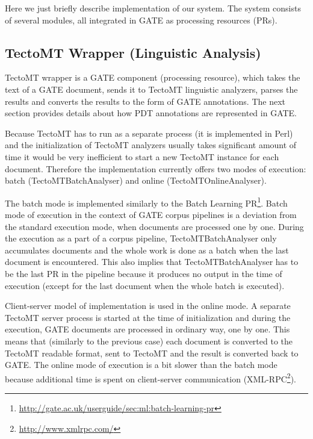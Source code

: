 Here we just briefly describe implementation of our system. The system consists of several modules, all integrated in GATE as processing resources (PRs).

\subsection{TectoMT Wrapper (Linguistic Analysis)} \label{sec:ch60_tectomt_wrapper}

TectoMT wrapper is a GATE component (processing resource), which takes the text of a GATE document, sends it to TectoMT linguistic analyzers, parses the results and converts the results to the form of GATE annotations. The next section provides details about how PDT annotations are represented in GATE.

Because TectoMT has to run as a separate process (it is implemented in Perl) and the initialization of TectoMT analyzers usually takes significant amount of time it would be very inefficient to start a new TectoMT instance for each document. Therefore the implementation currently offers two modes of execution: batch (TectoMTBatchAnalyser) and online (TectoMTOnlineAnalyser).

The batch mode is implemented similarly to the Batch Learning PR\footnote{\url{http://gate.ac.uk/userguide/sec:ml:batch-learning-pr}}. Batch mode of execution in the context of GATE corpus pipelines is a deviation from the standard execution mode, when documents are processed one by one. During the execution as a part of a corpus pipeline, TectoMTBatchAnalyser only accumulates documents and the whole work is done as a batch when the last document is encountered. This also implies that TectoMTBatchAnalyser has to be the last PR in the pipeline because it produces no output in the time of execution (except for the last document when the whole batch is executed). 

Client-server model of implementation is used in the online mode. A separate TectoMT server process is started at the time of initialization and during the execution, GATE documents are processed in ordinary way, one by one. This means that (similarly to the previous case) each document is converted to the TectoMT readable format, sent to TectoMT and the result is converted back to GATE. The online mode of execution is a bit slower than the batch mode because additional time is spent on client-server communication (XML-RPC\footnote{\url{http://www.xmlrpc.com/}}).



